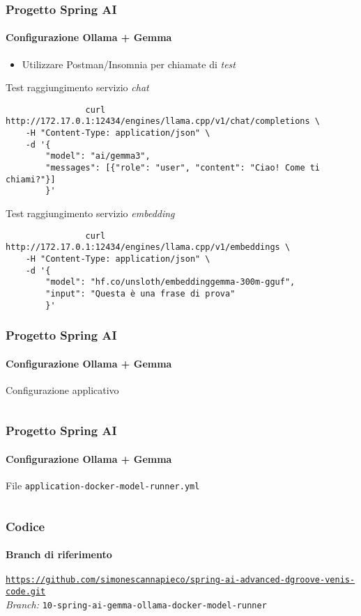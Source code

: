\begin{frame}[t,fragile] \frametitle{Progetto Spring AI}
    \framesubtitle{Configurazione Ollama + Gemma}
        \begin{itemize}[leftmargin=10pt,align=right]
            \item[\alert{\faExclamationTriangle}] Utilizzare Postman/Insomnia per chiamate di \textit{test}
        \end{itemize}
        \begin{codeblock}{Test raggiungimento servizio \textit{chat}}
            \begin{verbatim}
                curl http://172.17.0.1:12434/engines/llama.cpp/v1/chat/completions \
    -H "Content-Type: application/json" \
    -d '{
        "model": "ai/gemma3",
        "messages": [{"role": "user", "content": "Ciao! Come ti chiami?"}]
        }'
            \end{verbatim}
        \end{codeblock}
        \begin{codeblock}{Test raggiungimento servizio \textit{embedding}}
            \begin{verbatim}
                curl http://172.17.0.1:12434/engines/llama.cpp/v1/embeddings \
    -H "Content-Type: application/json" \
    -d '{
        "model": "hf.co/unsloth/embeddinggemma-300m-gguf",
        "input": "Questa è una frase di prova"
        }'
            \end{verbatim}
        \end{codeblock}
\end{frame}
%
\begin{frame}[t,fragile] \frametitle{Progetto Spring AI}
    \framesubtitle{Configurazione Ollama + Gemma}
        \begin{block}{Configurazione applicativo}
			{\tiny\inputminted{yaml}{code/application.yml}}
    	\end{block}
\end{frame}
%
\begin{frame}[t,fragile] \frametitle{Progetto Spring AI}
    \framesubtitle{Configurazione Ollama + Gemma}
        \begin{block}{File \texttt{application-docker-model-runner.yml}}
			{\tiny\inputminted{yaml}{code/application-docker-model-runner.yml}}
    	\end{block}
\end{frame}
%
\begin{frame}[fragile] \frametitle{Codice}
    \framesubtitle{Branch di riferimento}
	\begin{center}
		{\scriptsize \href{https://github.com/simonescannapieco/spring-ai-advanced-dgroove-venis-code.git}{\texttt{https://github.com/simonescannapieco/spring-ai-advanced-dgroove-venis-code.git}}}\\
		\textit{Branch:} \alert{\texttt{10-spring-ai-gemma-ollama-docker-model-runner}}
	\end{center}
\end{frame}